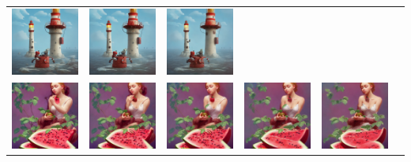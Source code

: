 \begin{table}[!htb]
\begin{tabular}{c c@{}c@{}c@{}c@{}c}
    \includegraphics[width=0.155\linewidth]{chapter/appendix/def_imgs/lighthouse/l_30.png} &
    \includegraphics[width=0.155\linewidth]{chapter/appendix/def_imgs/lighthouse/l_40.png} &
    \includegraphics[width=0.155\linewidth]{chapter/appendix/def_imgs/lighthouse/l_50.png} \\
    \includegraphics[width=0.155\linewidth]{chapter/appendix/def_imgs/melon/m_0.png} & 
    \includegraphics[width=0.155\linewidth]{chapter/appendix/def_imgs/melon/m_10.png} &
    \includegraphics[width=0.155\linewidth]{chapter/appendix/def_imgs/melon/m_20.png} &
    \includegraphics[width=0.155\linewidth]{chapter/appendix/def_imgs/melon/m_30.png} &
    \includegraphics[width=0.155\linewidth]{chapter/appendix/def_imgs/melon/m_40.png} &

\end{tabular}
\end{table}
